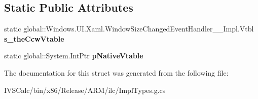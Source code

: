\subsection*{Static Public Attributes}
\begin{DoxyCompactItemize}
\item 
\mbox{\label{struct_windows_1_1_u_i_1_1_xaml_1_1_window_size_changed_event_handler_____impl_1_1_vtbl_a51ec3be39fae142108b2d81f9cd077ce}} 
static global\+::\+Windows.\+U\+I.\+Xaml.\+Window\+Size\+Changed\+Event\+Handler\+\_\+\+\_\+\+Impl.\+Vtbl {\bfseries s\+\_\+the\+Ccw\+Vtable}
\item 
\mbox{\label{struct_windows_1_1_u_i_1_1_xaml_1_1_window_size_changed_event_handler_____impl_1_1_vtbl_a28ba98812c974ef79a30cd46770d7cb8}} 
static global\+::\+System.\+Int\+Ptr {\bfseries p\+Native\+Vtable}
\end{DoxyCompactItemize}


The documentation for this struct was generated from the following file\+:\begin{DoxyCompactItemize}
\item 
I\+V\+S\+Calc/bin/x86/\+Release/\+A\+R\+M/ilc/Impl\+Types.\+g.\+cs\end{DoxyCompactItemize}
